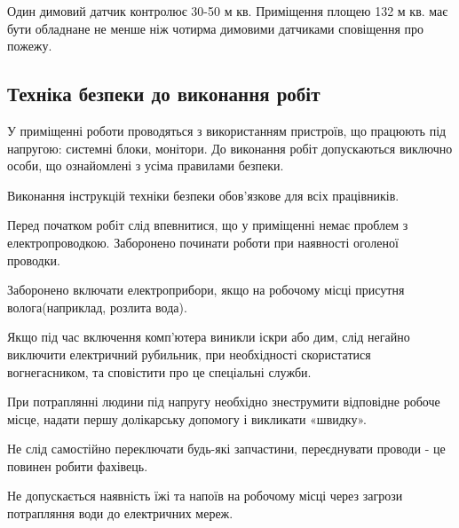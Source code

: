     Один димовий датчик контролює 30-50 м кв. Приміщення площею 132 м кв. має бути обладнане не менше ніж чотирма димовими датчиками сповіщення про пожежу.

\subsection{Техніка безпеки до виконання робіт}
    У приміщенні роботи проводяться з використанням пристроїв, що працюють під напругою: системні блоки, монітори. До виконання робіт допускаються виключно особи, що ознайомлені з усіма правилами безпеки.
    
    Виконання інструкцій техніки безпеки обов'язкове для всіх працівників.

    Перед початком робіт слід впевнитися, що у приміщенні немає проблем з електропроводкою. Заборонено починати роботи при наявності оголеної проводки.
    
    Заборонено включати електроприбори, якщо на робочому місці присутня волога(наприклад, розлита вода).
    
    Якщо під час включення комп'ютера виникли іскри або дим, слід негайно виключити електричний рубильник,
    при необхідності скористатися вогнегасником, та сповістити про це спеціальні служби.

    При потраплянні людини під напругу необхідно знеструмити відповідне робоче місце, надати першу долікарську допомогу і викликати «швидку».

    Не слід самостійно переключати будь-які запчастини, переєднувати проводи - це повинен робити фахівець.

    Не допускається наявність їжі та напоїв на робочому місці через загрози потрапляння води до електричних мереж.
